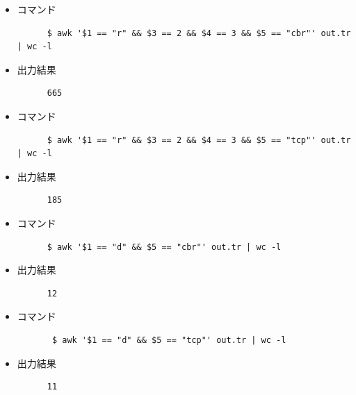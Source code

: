 \documentclass[paper=a4, fontsize=10pt]{jlreq}
\begin{document}
\begin{itemize}
  \item コマンド
    \begin{lstlisting}
      $ awk '$1 == "r" && $3 == 2 && $4 == 3 && $5 == "cbr"' out.tr | wc -l
    \end{lstlisting}

  \item 出力結果 
    \begin{lstlisting}
      665
    \end{lstlisting}
  \item コマンド
    \begin{lstlisting}
      $ awk '$1 == "r" && $3 == 2 && $4 == 3 && $5 == "tcp"' out.tr | wc -l
    \end{lstlisting}

  \item 出力結果 
    \begin{lstlisting}
      185
    \end{lstlisting}

  \item コマンド
    \begin{lstlisting}
      $ awk '$1 == "d" && $5 == "cbr"' out.tr | wc -l
    \end{lstlisting}

  \item 出力結果 
    \begin{lstlisting}
      12
    \end{lstlisting}

  \item コマンド
    \begin{lstlisting}
       $ awk '$1 == "d" && $5 == "tcp"' out.tr | wc -l
     \end{lstlisting}

  \item 出力結果 
    \begin{lstlisting}
      11
    \end{lstlisting}

\end{itemize}
\end{document}

